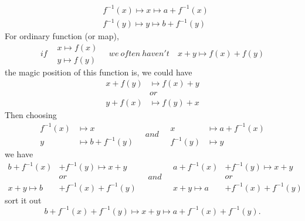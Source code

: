 \documentclass{Math_Note}
\begin{document}
\begin{sol}
\begin{equation}
\begin{split}
        & f^{-1}(x) \mapsto x \mapsto a+f^{-1}(x) \\
        & f^{-1}(y) \mapsto y \mapsto b+f^{-1}(y)
    \end{split}
\end{equation}
\textcolor{softcyan}{
For ordinary function (or map),  
\begin{equation}
    if
    \begin{split}
        & x \mapsto f(x) \\
        & y \mapsto f(y)
    \end{split}
    \quad
    we\ often\ haven't\quad
    x+y \mapsto f(x)+f(y)
\end{equation}
the magic position of this function is, we could have 
\begin{equation}
    \begin{split}
        x+f(y) &\mapsto f(x)+y \\
        &or\\
        y+f(x) &\mapsto f(y)+x
    \end{split}
\end{equation}
}
Then choosing 
\begin{equation}
    \begin{split}
        f^{-1}(x) & \mapsto x \\
        y & \mapsto b+f^{-1}(y)
    \end{split}
    \quad and \quad
    \begin{split}
        x & \mapsto a+f^{-1}(x) \\
        f^{-1}(y) & \mapsto y
    \end{split}
\end{equation}
we have 
\begin{equation}
    \begin{split}
        b+f^{-1}(x)&+f^{-1}(y) \mapsto x+y \\
        &or \\
        x+y \mapsto b&+f^{-1}(x)+f^{-1}(y)
    \end{split}
    \quad and \quad
    \begin{split}
        a+f^{-1}(x)&+f^{-1}(y) \mapsto x+y \\
        &or \\
        x+y \mapsto a&+f^{-1}(x)+f^{-1}(y)
    \end{split}
\end{equation}
sort it out 
\begin{equation}
    b+f^{-1}(x)+f^{-1}(y) \mapsto x+y \mapsto a+f^{-1}(x)+f^{-1}(y). 

\end{equation}
\end{sol}
\end{document}
